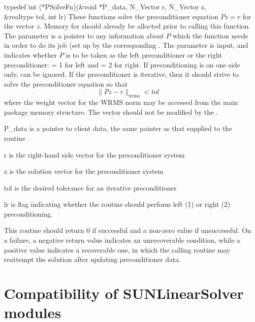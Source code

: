 {
  typedef int (*PSolveFn)(&void *P\_data, N\_Vector r, N\_Vector z, \\
                          &realtype tol, int lr)
}
{
  These functions solve the preconditioner equation $Pz = r$
  for the vector $z$.  Memory for  should already be
  allocted prior to calling this function.  The
  parameter  is a pointer to any information about $P$
  which the function needs in order to do its job (set up by the
  corresponding . The parameter  is input, and
  indicates whether $P$ is to be taken as the left preconditioner or
  the right preconditioner:  = 1 for left and  = 2 for
  right.  If preconditioning is on one side only,  can be
  ignored.  If the preconditioner is iterative, then it should strive
  to solve the preconditioner equation so that 
  \[
      \| Pz - r \|_{\text{wrms}} < tol
  \]
  where the weight vector for the WRMS norm may be accessed from the
  main package memory structure.  The vector  should not be
  modified by the .  
}
{
  \begin{args}
  \item[P\_data]
    is a pointer to client data, the same pointer as that supplied to the routine .
  \item[r]
    is the right-hand side vector for the preconditioner system
  \item[z]
    is the solution vector for the preconditioner system
  \item[tol]
    is the desired tolerance for an iterative preconditioner
  \item[lr]
    is flag indicating whether the routine should perform left (1) or
    right (2) preconditioning.
  \end{args}
}
{  
  This routine should return 0 if successful and a non-zero value if
  unsuccessful.  On a failure, a negative return value indicates an
  unrecoverable condition, while a positive value indicates a
  recoverable one, in which the calling routine may reattempt the
  solution after updating preconditioner data.
}
{
}


\section{Compatibility of SUNLinearSolver modules}\label{ss:sunlinsol_compatibility}


